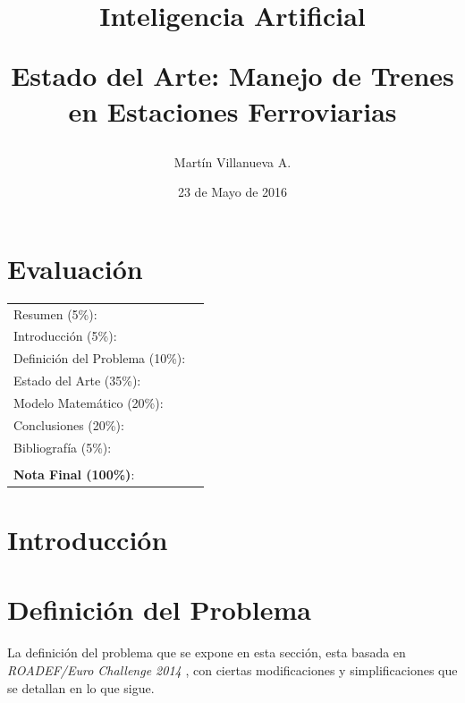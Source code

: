 \documentclass[letter, 10pt]{article}
\begin{document}
\title{Inteligencia Artificial \\ \begin{Large}Estado del Arte: Manejo de Trenes en Estaciones Ferroviarias\end{Large}}
\author{Martín Villanueva A.}
\date{23 de Mayo de 2016}
\maketitle


\section*{Evaluación}

\begin{tabular}{ll}
Resumen (5\%): & \underline{\hspace{2cm}} \\
Introducción (5\%):  & \underline{\hspace{2cm}} \\
Definición del Problema (10\%):  & \underline{\hspace{2cm}} \\
Estado del Arte (35\%):  & \underline{\hspace{2cm}} \\
Modelo Matemático (20\%): &  \underline{\hspace{2cm}}\\
Conclusiones (20\%): &  \underline{\hspace{2cm}}\\
Bibliografía (5\%): & \underline{\hspace{2cm}}\\
 &  \\
\textbf{Nota Final (100\%)}:   & \underline{\hspace{2cm}}
\end{tabular}
\vspace{2cm}


\begin{abstract}

\end{abstract}

\section{Introducción}


\section{Definición del Problema}
La definición del problema que se expone en esta sección, esta basada en \textit{ROADEF/Euro Challenge 2014} 
\cite{Problem}, con ciertas modificaciones y simplificaciones que se detallan en lo que sigue.
\end{document}
